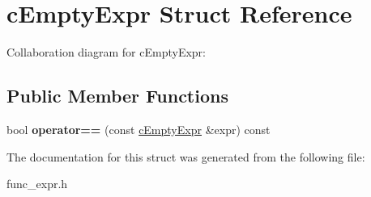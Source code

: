 \hypertarget{structcEmptyExpr}{\section{c\-Empty\-Expr Struct Reference}
\label{structcEmptyExpr}
}


Collaboration diagram for c\-Empty\-Expr\-:
\subsection*{Public Member Functions}
\begin{DoxyCompactItemize}
\item 
\hypertarget{structcEmptyExpr_ae61fe1f368032f51d999710129c9434b}{bool {\bfseries operator==} (const \hyperlink{structcEmptyExpr}{c\-Empty\-Expr} \&expr) const }\label{structcEmptyExpr_ae61fe1f368032f51d999710129c9434b}

\end{DoxyCompactItemize}


The documentation for this struct was generated from the following file\-:\begin{DoxyCompactItemize}
\item 
func\-\_\-expr.\-h\end{DoxyCompactItemize}
